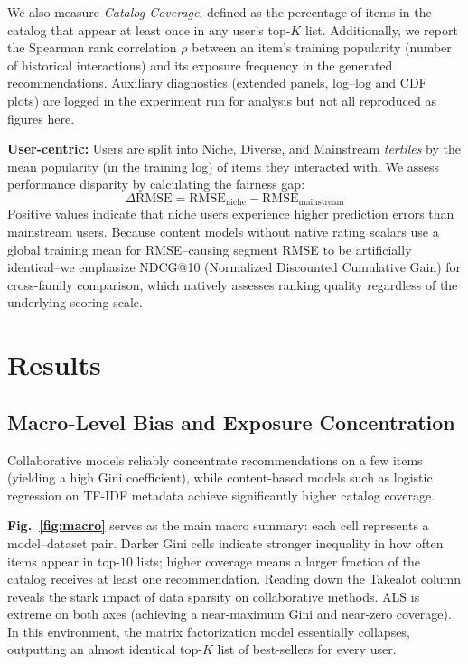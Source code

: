 \documentclass[conference]{IEEEtran}
\begin{document}
We also measure \textit{Catalog Coverage}, defined as the percentage of items in the catalog that appear at least once in any user's top-$K$ list. Additionally, we report the Spearman rank correlation $\rho$ between an item's training popularity (number of historical interactions) and its exposure frequency in the generated recommendations. Auxiliary diagnostics (extended panels, log--log and CDF plots) are logged in the experiment run for analysis but not all reproduced as figures here.

\textbf{User-centric:} Users are split into Niche, Diverse, and Mainstream \emph{tertiles} by the mean popularity (in the training log) of items they interacted with. We assess performance disparity by calculating the fairness gap:
\begin{equation}
    \Delta\mathrm{RMSE} = \mathrm{RMSE}_{\mathrm{niche}} - \mathrm{RMSE}_{\mathrm{mainstream}}
\end{equation}
Positive values indicate that niche users experience higher prediction errors than mainstream users. Because content models without native rating scalars use a global training mean for RMSE--causing segment RMSE to be artificially identical--we emphasize NDCG@10 (Normalized Discounted Cumulative Gain) for cross-family comparison, which natively assesses ranking quality regardless of the underlying scoring scale.

\section{Results}
\label{sec:results}

\subsection{Macro-Level Bias and Exposure Concentration}

Collaborative models reliably concentrate recommendations on a few items (yielding a high Gini coefficient), while content-based models such as logistic regression on TF-IDF metadata achieve significantly higher catalog coverage.

\textbf{Fig.~\ref{fig:macro}} serves as the main macro summary: each cell represents a model--dataset pair. Darker Gini cells indicate stronger inequality in how often items appear in top-$10$ lists; higher coverage means a larger fraction of the catalog receives at least one recommendation. Reading down the Takealot column reveals the stark impact of data sparsity on collaborative methods. ALS is extreme on both axes (achieving a near-maximum Gini and near-zero coverage). In this environment, the matrix factorization model essentially collapses, outputting an almost identical top-$K$ list of best-sellers for every user.
\end{document}
